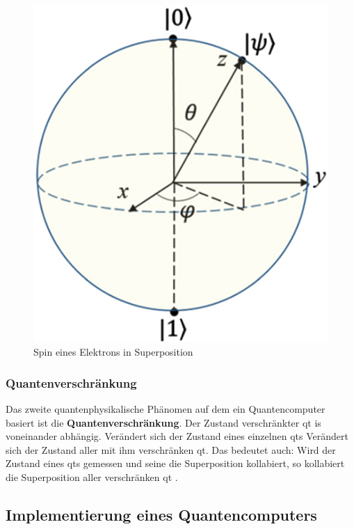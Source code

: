 \begin{figure}[!hbt]
    \centering
    \includegraphics{./images/spin-superpostition.jpg}
    \caption{Spin eines Elektrons in Superposition \cite{noauthor_cpb_27_9_090308_f8jpg_nodate}}
    \label{fig:spin}
\end{figure}

\subsubsection{Quantenverschränkung}
Das zweite quantenphysikalische Phänomen auf dem ein Quantencomputer basiert ist die \textbf{Quantenverschränkung}. Der Zustand verschränkter \ac{qt} is voneinander abhängig. Verändert sich der Zustand eines einzelnen \ac{qt}s Verändert sich der Zustand aller mit ihm verschränken \ac{qt}. Das bedeutet auch: Wird der Zustand eines \ac{qt}s gemessen und seine die Superposition kollabiert, so kollabiert die Superposition aller verschränken \ac{qt} \cite{miller_principles_nodate}.\\

\subsection{Implementierung eines Quantencomputers}


